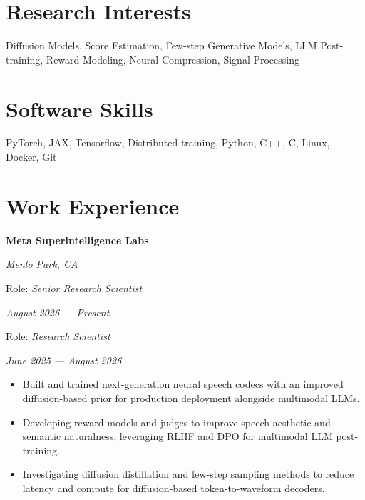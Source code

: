 \documentclass[10pt,margin,centered]{res}
\newcommand\quelle[1]{{%
      \unskip\nobreak\hfil\penalty50
      \hbox{}\nobreak\hfil\emph{#1}%
      \parfillskip=0pt \finalhyphendemerits=0 \par}}
\begin{document}
\begin{resume}

\section{
\sc Research Interests
}
Diffusion Models, Score Estimation, Few-step Generative Models, LLM Post-training, Reward Modeling, Neural Compression, Signal Processing
\vspace{-1mm}
\section{
\sc Software Skills
}
PyTorch, JAX, Tensorflow, Distributed training, Python, C++, C, Linux, Docker, Git

\vspace{-1mm}
\section{\sc Work Experience}
{\bf Meta Superintelligence Labs} \quelle{Menlo Park, CA}
\vspace{-4mm}
Role: \textit{Senior Research Scientist} \quelle{August 2026 --- Present}
\vspace{-4mm}
Role: \textit{Research Scientist} \quelle{June 2025 --- August 2026}
\begin{itemize}
    \item Built and trained next-generation neural speech codecs with an improved diffusion-based prior for production deployment alongside multimodal LLMs.
    \item Developing reward models and judges to improve speech aesthetic and semantic naturalness, leveraging RLHF and DPO for multimodal LLM post-training.
    \item Investigating diffusion distillation and few-step sampling methods to reduce latency and compute for diffusion-based token-to-waveform decoders.
\end{itemize}



\end{resume}
\end{document}
